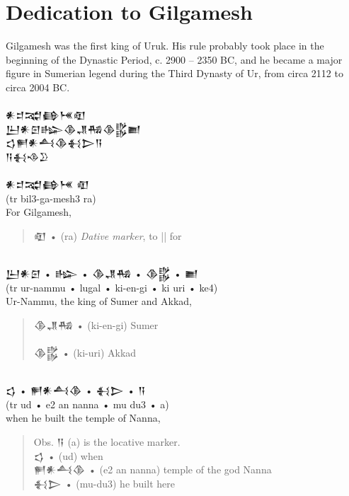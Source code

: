 \documentclass[a4paper,12pt]{book}
\newcommand{\fcn}{\setmainfont{Akkadian.otf}}
\newcommand{\fcm}{\large\setmainfont{Akkadian.otf}}
\newcommand{\fsm}{\Large\setmainfont{Akkadian.otf}}
\begin{document}
\section*{Dedication to Gilgamesh}
Gilgamesh was the first king of Uruk. His rule
probably took place in the beginning of the
Dynastic Period, c. 2900 – 2350 BC, and he became
a major figure in Sumerian legend during the
Third Dynasty of Ur, from circa 2112 to circa 2004 BC.\\

\verb||\\
{\fsm 𒀭𒄑𒉋𒂵𒎌𒊏}\\
{\fsm 𒌨𒀭𒇉𒈗𒆠𒂗𒄀𒆠𒌵𒆤}\\
{\fsm 𒌓𒂍𒀭𒋀𒆠𒈬𒆕𒀀}\\
{\fsm 𒀀𒈬𒈾𒊒}\\

\verb||\\
{\large\fcn 𒀭𒄑𒉋𒂵𒎌 𒊏}\\
(tr bil3-ga-mesh3 ra)\\
For Gilgamesh,
\begin{quote}
{\fcm 𒊏} • (ra) {\em Dative marker}, to || for\\
\end{quote}

\verb||\\
{\fcm 𒌨𒀭𒇉} • {\fcm 𒈗} • {\fcm 𒆠𒂗𒄀}
     • {\fcm 𒆠𒌵} • {\fcm 𒆤}\\
(tr ur-nammu  • lugal  • ki-en-gi • ki uri • ke4)\\
Ur-Nammu, the king of Sumer and Akkad,\\
\begin{quote}
{\fcm 𒆠𒂗𒄀} • (ki-en-gi) Sumer\\
\verb||\\  
{\fcm 𒆠𒌵} • (ki-uri) Akkad
\end{quote}

\verb||\\
{\fcm 𒌓} • {\fcm 𒂍𒀭𒋀𒆠} • {\fcm 𒈬𒆕} • {\fcm 𒀀}\\
(tr ud • e2 an nanna • mu du3 • a)\\
when he built the temple of Nanna,\\
\begin{quote}
Obs. {\fcn 𒀀} (a) is the locative marker.\\
{\fcm 𒌓} • (ud) when\\
{\fcm 𒂍𒀭𒋀𒆠} • (e2 an nanna) temple of the god Nanna\\
{\fcm 𒈬𒆕} • (mu-du3) he built here
\end{quote}
\end{document}
